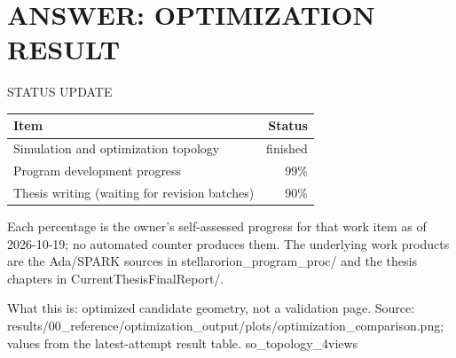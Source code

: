 \documentclass[aspectratio=169,11pt]{beamer}
\begin{document}
\section{ANSWER: OPTIMIZATION RESULT}
\begin{frame}{STATUS UPDATE}
  \begin{tabular}{@{}p{7.2cm}r@{}}
    \textbf{Item} & \textbf{Status} \\
    \hline
    Simulation and optimization topology & finished \\
    Program development progress & 99\% \\
    Thesis writing (waiting for revision batches) & 90\% \\
  \end{tabular}
  \vspace{0.4cm}
  \par{\scriptsize Each percentage is the owner's self-assessed progress for
  that work item as of 2026-10-19; no automated counter produces them. The
  underlying work products are the Ada/SPARK sources in
  stellarorion\_program\_proc/ and the thesis chapters in
  CurrentThesisFinalReport/.}
\end{frame}
  {%
   What this is: optimized candidate geometry, not a validation page.
   Source: results/00\_reference/optimization\_output/plots/optimization\_comparison.png;
   values from the latest-attempt result table.}
  {so_topology_4views}
\end{document}
